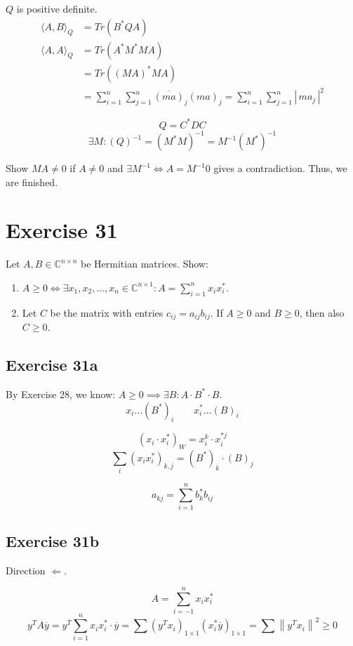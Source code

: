\documentclass[a4paper]{article}
\theoremstyle{definition}
\newcommand\card[1]{\left|\,#1\,\right|}
\newcommand\angel[1]{\langle#1\rangle}
\newcommand\norm[1]{\left\|{#1}\right\|}
\begin{document}
$Q$ is positive definite.
\begin{align*}
  \angel{A,B}_Q &= Tr(B^*QA) \\
  \angel{A,A}_Q &= Tr(A^* M^* M A) \\
    &= Tr((MA)^* MA) \\
    &= \sum_{i=1}^n \sum_{j=1}^n \overline{(ma)}_j (ma)_j = \sum_{i=1}^n \sum_{j=1}^n  \card{ma_j}^2
\end{align*}

\[ Q = C^* DC \]
\[ \exists M: (Q)^{-1} = (M^* M)^{-1} = M^{-1} (M^*)^{-1} \]

Show $MA \neq 0$ if $A \neq 0$ and $\exists M^{-1} \iff A = M^{-1} 0$ gives a contradiction. Thus, we are finished.

\section{Exercise 31}
\begin{ex}
  Let $A, B \in \mathbb C^{n\times n}$ be Hermitian matrices. Show:
  \begin{enumerate}
    \item $A \geq 0 \iff \exists x_1, x_2, \dots, x_n \in \mathbb C^{n\times 1}: A = \sum_{i=1}^n x_i x_i^*$.
    \item Let $C$ be the matrix with entries $c_{ij} = a_{ij} b_{ij}$. If $A \geq 0$ and $B \geq 0$, then also $C \geq 0$.
  \end{enumerate}
\end{ex}

\subsection{Exercise 31a}

By Exercise 28, we know: $A \geq 0 \implies \exists B: A \cdot B^* \cdot B$.
\[ x_i \ldots (B^*)_i \qquad x_i^* \ldots (B)_i \]

\[ (x_i \cdot x_i^*)_W = x_i^k \cdot x_i^{*j} \]
\[ \sum_{i} (x_i x_i^*)_{k,j} = (B^*)_k \cdot (B)_j \]

\[ a_{kj} = \sum_{i=1}^n b_k^* b_{ij} \]

\subsection{Exercise 31b}

Direction $\Leftarrow$.

\[ A = \sum_{i=-1}^n x_i x_i^* \]
\[ y^T A \overline{y} = y^T \sum_{i=1}^n x_i x_i^* \cdot \overline{y} = \sum (y^T x_i)_{1\times 1} (x_i^* \overline{y})_{1 \times 1} = \sum \norm{y^T x_i}^2 \geq 0 \]
\end{document}
